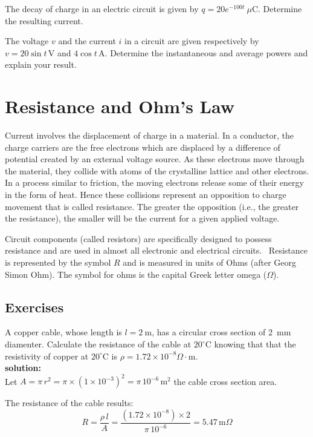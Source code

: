 \begin{problem}
The decay of charge in an electric circuit is given by $q = 20e^{-100t}~\mu\textrm{C}$. Determine the resulting current.
\end{problem}

\begin{problem}
The voltage $v$ and the current $i$ in a circuit are given respectively by $v = 20\sin t\,\textrm{V}$ and $4\cos t\,\textrm{A}$. Determine the instantaneous and average powers and explain your result.
\end{problem}

\section{Resistance and Ohm's Law}
Current involves the displacement of charge in a material. In a conductor, the charge carriers are the free electrons which are displaced by a difference of potential created by an external voltage source. As these electrons move through the material, they collide with atoms of the crystalline lattice and other electrons. In a process similar to friction, the moving electrons release some of their energy in the form of heat. Hence these collisions represent an opposition to charge movement that is called resistance. The greater the opposition (i.e., the greater the resistance), the smaller will be the current for a given applied voltage.

Circuit components (called resistors) are specifically designed to possess resistance and are used in almost all electronic and electrical circuits. 
Resistance is represented by the symbol $R$ and is measured in units of Ohms (after Georg Simon Ohm). The symbol for ohms is the capital Greek letter omega ($\Omega$).

\subsection*{Exercises}
\begin{exercise}
A copper cable, whose length is $l=2~\textrm{m}$, has a circular cross section of 2~mm diamenter. Calculate the resistance of the cable at $20^{\circ}\textrm{C}$ knowing that that the resistivity of copper at $20^{\circ}\textrm{C}$ is $\rho = 1.72 \times 10^{-8}\Omega\cdot\textrm{m}$. \\

\textbf{solution:}\\
Let $A = \pi\,r^2= \pi \times (1 \times 10^{-3})^2 =\pi\,10^{-6}\,\textrm{m}^2$ the cable cross section area.

The resistance of the cable results:
\[R = \frac{\rho\,l}{A} = \frac{(1.72 \times 10^{-8}) \times 2}{\pi\,10^{-6}}= 5.47\,\textrm{m}\Omega\]
\end{exercise}

